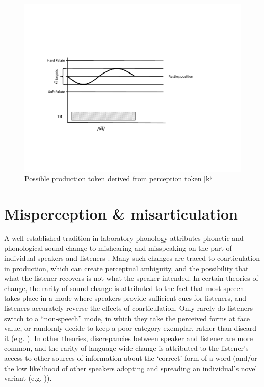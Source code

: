 \begin{figure}[H]
\centering{}\includegraphics[width=\textwidth]{figures/palatalizationc.pdf}\caption{\label{fig:Palatalizationc}Possible production token derived from
perception token {[}{kʲi}{]}}
\end{figure}


\section{\label{subsec:Misperception-=000026-Misarticulation}Misperception \& misarticulation}

A well-established tradition in laboratory phonology attributes phonetic
and phonological sound change to mishearing and misspeaking on the
part of individual speakers and listeners \citep{Ohala1980,Ohala1981,ohala1983origin,Ohala1990}.
Many such changes are traced to coarticulation in production, which
can create perceptual ambiguity, and the possibility that what the
listener recovers is not what the speaker intended. In certain theories
of change, the rarity of sound change is attributed to the fact that
most speech takes place in a mode where speakers provide sufficient
cues for listeners, and listeners accurately reverse the effects of
coarticulation. Only rarely do listeners switch to a ``non-speech''
mode, in which they take the perceived forms at face value, or randomly
decide to keep a poor category exemplar, rather than discard it (e.g.
\citealp{lindblom1990explaining,Garrett2013}). In other theories,
discrepancies between speaker and listener are more common, and the
rarity of language-wide change is attributed to the listener's access
to other sources of information about the `correct' form of a word
(and/or the low likelihood of other speakers adopting and spreading
an individual's novel variant (e.g. \citealt{Ohala1980})). 

